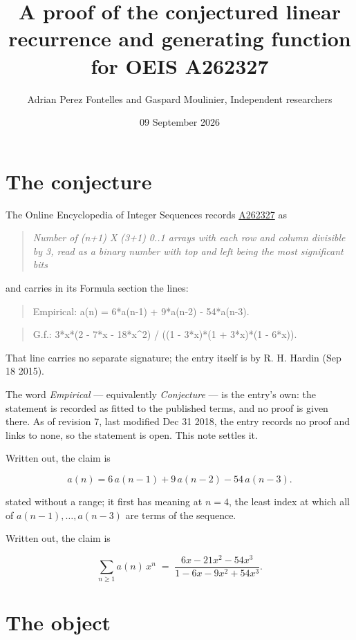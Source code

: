 \documentclass[11pt]{article}
\title{A proof of the conjectured linear recurrence and generating function for OEIS A262327}
\author{Adrian Perez Fontelles and Gaspard Moulinier, Independent researchers}
\date{09 September 2026}
\theoremstyle{definition}
\begin{document}
\maketitle
\section{The conjecture}

The Online Encyclopedia of Integer Sequences records \href{https://oeis.org/A262327}{A262327} as

\begin{quote}\itshape Number of (n+1) X (3+1) 0..1 arrays with each row and column divisible by 3, read as a binary number with top and left being the most significant bits\end{quote}

and carries in its Formula section the lines:

\begin{quote}\ttfamily Empirical: a(n) = 6*a(n-1) + 9*a(n-2) - 54*a(n-3).\end{quote}

\begin{quote}\ttfamily G.f.: 3*x*(2 - 7*x - 18*x\textasciicircum{}2) / ((1 - 3*x)*(1 + 3*x)*(1 - 6*x)).\end{quote}

That line carries no separate signature; the entry itself is by R. H. Hardin (Sep 18 2015).

The word {\itshape Empirical} --- equivalently {\itshape Conjecture} --- is the entry's own: the statement is recorded as fitted to the published terms, and no proof is given there. As of revision 7, last modified Dec 31 2018, the entry records no proof and links to none, so the statement is open. This note settles it.

Written out, the claim is

\[a(n) = 6\,a(n-1) + 9\,a(n-2) - 54\,a(n-3).\]

stated without a range; it first has meaning at $n = 4$, the least index at which all of $a(n-1),\dots,a(n-3)$ are terms of the sequence.

Written out, the claim is

\[\sum_{n \ge 1} a(n)\,x^n \;=\; \frac{6x - 21x^{2} - 54x^{3}}{1 - 6x - 9x^{2} + 54x^{3}}.\]

\section{The object}
\end{document}
